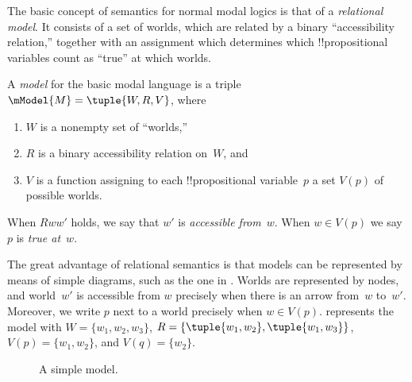 \documentclass[../../../include/open-logic-section]{subfiles}
\begin{document}


The basic concept of semantics for normal modal logics is that of a
\emph{relational model}. It consists of a set of worlds, which are
related by a binary ``accessibility relation,'' together with an
assignment which determines which !!{propositional variable}s count as
``true'' at which worlds.

\begin{defn}
  A \emph{model} for the basic modal language is a triple $\mModel{M}
  = \tuple{W, R, V}$, where
  \begin{enumerate}
  \item $W$ is a nonempty set of ``worlds,''
  \item $R$ is a binary accessibility relation on~$W$, and
  \item $V$ is a function assigning to each !!{propositional
    variable}~$p$ a set $V(p)$ of possible worlds.
  \end{enumerate}
  When $Rww'$ holds, we say that $w'$ is \emph{accessible
    from}~$w$. When $w \in V(p)$ we say $p$ is \emph{true at}~$w$.
\end{defn}

The great advantage of relational semantics is that models can be
represented by means of simple diagrams, such as the one in
. Worlds are represented by nodes, and world~$w'$ is
accessible from $w$ precisely when there is an arrow from~$w$
to~$w'$. Moreover, we write $p$ next to a world precisely when $w \in
V(p)$.  represents the model with $W = \{w_1, w_2,
w_3\}$, $R = \{\tuple{w_1, w_2},\tuple{w_1, w_3}\}$, $V(p) = \{w_1,
w_2\}$, and $V(q) = \{w_2\}$.

\begin{figure}
  \begin{center}
  \end{center}
\caption{A simple model.}
\end{figure}
\end{document}
